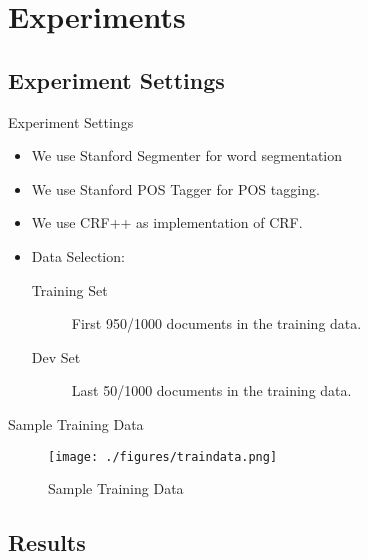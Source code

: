 \documentclass{beamer}
\begin{document}
\section{Experiments}
\subsection{Experiment Settings}
\frame{\sectionpage}

\begin{frame}{Experiment Settings}
	\begin{itemize}
		\item We use Stanford Segmenter\citep{tseng2005conditional} for word segmentation
			\pause
		\item We use Stanford POS Tagger\citep{toutanova2000enriching} for POS tagging.
			\pause
		\item We use CRF++ as implementation of CRF.
			\pause
		\item Data Selection:
			\begin{description}
				\item[Training Set] First 950/1000 documents in the training data.
				\item[Dev Set] Last 50/1000 documents in the training data.
			\end{description}
	\end{itemize}
\end{frame}

\begin{frame}{Sample Training Data}
	\begin{figure}[h]
		\centering
		\texttt{[image: ./figures/traindata.png]}
		\caption{Sample Training Data}
		\label{fig:traindata}
	\end{figure}
\end{frame}

\subsection{Results}
\end{document}
